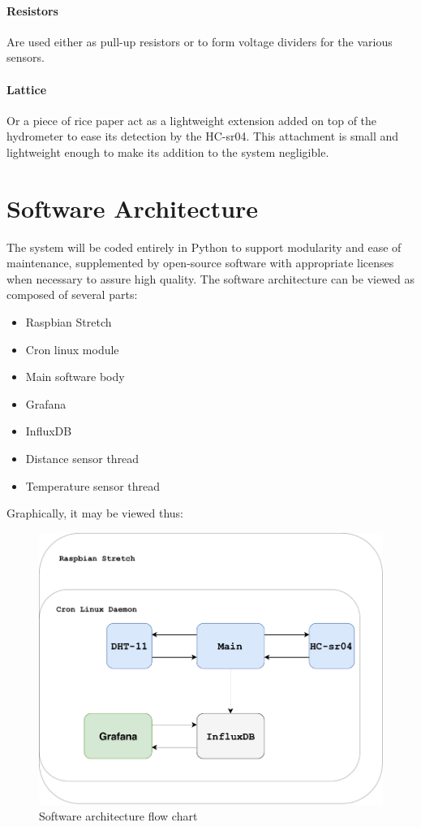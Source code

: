 \documentclass[twoside]{ctuthesis}
\theoremstyle{plain}
\theoremstyle{definition}
\theoremstyle{note}
\begin{document}
\paragraph{Resistors} Are used either as pull-up resistors or to form voltage dividers for the various sensors.
\paragraph{Lattice} Or a piece of rice paper act as a lightweight extension added on top of the hydrometer to ease its detection by the HC-sr04. This attachment is small and lightweight enough to make its addition to the system negligible.
\newpage
\section{Software Architecture}
The system will be coded entirely in Python to support modularity and ease of maintenance, supplemented by open-source software with appropriate licenses when necessary to assure high quality. The software architecture can be viewed as composed of several parts:\\

\begin{itemize}
	\item Raspbian Stretch
	\item Cron linux module
	\item Main software body
	\item Grafana
	\item InfluxDB
	\item Distance sensor thread
	\item Temperature sensor thread
\end{itemize}

Graphically, it may be viewed thus:

\begin{figure}[H]
	\centering
	\includegraphics[width = \textwidth]{System_architecture}
	\caption{Software architecture flow chart}
\end{figure}
\end{document}
